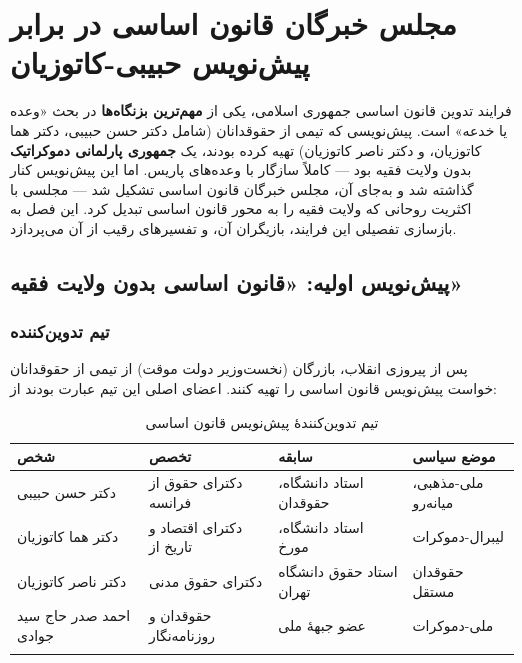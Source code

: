 \documentclass[12pt,a4paper]{book}
\newcommand{\keyword}[1]{\textbf{\textcolor{cPrimary}{#1}}}
\newcommand{\en}[1]{\lr{\textit{#1}}}
\begin{document}
\chapter{مجلس خبرگان قانون اساسی در برابر پیش‌نویس حبیبی-کاتوزیان}

\begin{infoBox}
فرایند تدوین قانون اساسی جمهوری اسلامی، یکی از \keyword{مهم‌ترین بزنگاه‌ها} در بحث «وعده یا خدعه» است. پیش‌نویسی که تیمی از حقوقدانان (شامل دکتر حسن حبیبی، دکتر هما کاتوزیان، و دکتر ناصر کاتوزیان) تهیه کرده بودند، یک \keyword{جمهوری پارلمانی دموکراتیک} بدون ولایت فقیه بود — کاملاً سازگار با وعده‌های پاریس. اما این پیش‌نویس کنار گذاشته شد و به‌جای آن، مجلس خبرگان قانون اساسی تشکیل شد — مجلسی با اکثریت روحانی که ولایت فقیه را به محور قانون اساسی تبدیل کرد. این فصل به بازسازی تفصیلی این فرایند، بازیگران آن، و تفسیرهای رقیب از آن می‌پردازد.
\end{infoBox}

\section{پیش‌نویس اولیه: «قانون اساسی بدون ولایت فقیه»}

\subsection{تیم تدوین‌کننده}

پس از پیروزی انقلاب، بازرگان (نخست‌وزیر دولت موقت) از تیمی از حقوقدانان خواست پیش‌نویس قانون اساسی را تهیه کنند. اعضای اصلی این تیم عبارت بودند از:

\begin{longtable}{%
    >{\raggedleft\arraybackslash}p{}
    >{\raggedleft\arraybackslash}p{}
    >{\raggedleft\arraybackslash}p{}
    >{\raggedleft\arraybackslash}p{}}
\toprule
\rowcolor{cPrimary!10}
\textbf{شخص} & \textbf{تخصص} & \textbf{سابقه} & \textbf{موضع سیاسی} \\
\midrule
\endhead

دکتر حسن حبیبی &
دکترای حقوق از فرانسه &
استاد دانشگاه، حقوقدان &
ملی-مذهبی، میانه‌رو \\
\midrule

دکتر هما کاتوزیان &
دکترای اقتصاد و تاریخ از \en{Oxford} &
استاد دانشگاه، مورخ &
لیبرال-دموکرات \\
\midrule

دکتر ناصر کاتوزیان &
دکترای حقوق مدنی &
استاد حقوق دانشگاه تهران &
حقوقدان مستقل \\
\midrule

احمد صدر حاج سید جوادی &
حقوقدان و روزنامه‌نگار &
عضو جبههٔ ملی &
ملی-دموکرات \\

\bottomrule
\caption{تیم تدوین‌کنندهٔ پیش‌نویس قانون اساسی}
\label{tab:draft-team}
\end{longtable}
\end{document}
